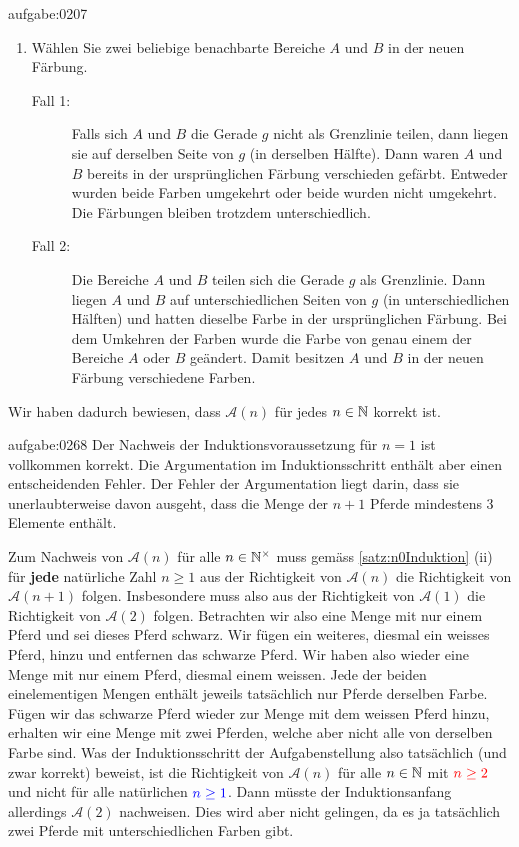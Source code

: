 \begin{antwort}{aufgabe:0207}
\begin{aenum}
\begin{renum}
\begin{enumerate}
                \item Wählen Sie zwei beliebige benachbarte Bereiche $A$ und $B$ in der neuen Färbung.
            \begin{description}
                \item[Fall 1:] Falls sich $A$ und $B$ die Gerade $g$ nicht als Grenzlinie teilen, dann liegen sie auf derselben Seite von $g$ (in derselben Hälfte). Dann waren $A$ und $B$ bereits in der ursprünglichen Färbung verschieden gefärbt. Entweder wurden beide Farben umgekehrt oder beide wurden nicht umgekehrt. Die Färbungen bleiben trotzdem unterschiedlich.
                \item[Fall 2:] Die Bereiche $A$ und $B$ teilen sich die Gerade $g$ als Grenzlinie. Dann liegen $A$ und $B$ auf unterschiedlichen Seiten von $g$ (in unterschiedlichen Hälften) und hatten dieselbe Farbe in der ursprünglichen Färbung. Bei dem Umkehren der Farben wurde die Farbe von genau einem der Bereiche $A$ oder $B$ geändert. Damit besitzen $A$ und $B$ in der neuen Färbung verschiedene Farben.
            \end{description}
            \end{enumerate}
        \end{renum}
\end{aenum}
Wir haben dadurch bewiesen, dass $\mathcal{A}(n)$ für jedes $n\in\mathbb{N}$ korrekt ist.
\end{antwort}


\begin{antwort}{aufgabe:0268}
    Der Nachweis der Induktionsvoraussetzung für $n=1$ ist vollkommen korrekt. Die Argumentation im Induktionsschritt enthält aber einen entscheidenden Fehler. Der Fehler der Argumentation liegt darin, dass sie unerlaubterweise davon ausgeht, dass die Menge der $n+1$ Pferde mindestens 3 Elemente enthält.
    
    Zum Nachweis von $\mathcal{A}(n)$ für alle $n\in\mathbb{N}^{\times}$ muss gemäss \cref{satz:n0Induktion} (ii) für \textbf{jede} natürliche Zahl $n\geq 1$ aus der Richtigkeit von $\mathcal{A}(n)$ die Richtigkeit von $\mathcal{A}(n+1)$ folgen. Insbesondere muss also aus der Richtigkeit von $\mathcal{A}(1)$ die Richtigkeit von $\mathcal{A}(2)$ folgen. Betrachten wir also eine Menge mit nur einem Pferd und sei dieses Pferd schwarz. Wir fügen ein weiteres, diesmal ein weisses Pferd, hinzu und entfernen das schwarze Pferd. Wir haben also wieder eine Menge mit nur einem Pferd, diesmal einem weissen. Jede der beiden einelementigen Mengen enthält jeweils tatsächlich nur Pferde derselben Farbe. Fügen wir das schwarze Pferd wieder zur Menge mit dem weissen Pferd hinzu, erhalten wir eine Menge mit zwei Pferden, welche aber nicht alle von derselben Farbe sind. Was der Induktionsschritt der Aufgabenstellung also tatsächlich (und zwar korrekt) beweist, ist die Richtigkeit von $\mathcal{A}(n)$ für alle $n\in\mathbb{N}$ mit $\textcolor{Red}{n\geq 2}$ und nicht für alle natürlichen $\textcolor{Blue}{n\geq 1}$. Dann müsste der Induktionsanfang allerdings $\mathcal{A}(2)$ nachweisen. Dies wird aber nicht gelingen, da es ja tatsächlich zwei Pferde mit unterschiedlichen Farben gibt. \cite{Piotr}
\end{antwort}


